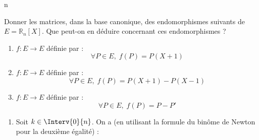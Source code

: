 n\documentclass[a4paper,10pt]{report}
\begin{document}
\begin{Exercice}{} Donner les matrices, dans la base canonique, des endomorphismes suivants de $E=\mathbb{R}_n[X]$. Que peut-on en déduire concernant ces endomorphismes ?

\begin{enumerate}
\item $f : E \rightarrow E$ définie par :
$$ \forall P \in E, \; f(P) = P(X+1) $$
\item $f : E \rightarrow E$ définie par :
$$ \forall P \in E, \; f(P) = P(X+1)-P(X-1) $$
\item $f : E \rightarrow E$ définie par :
$$ \forall P \in E, \; f(P) = P-P' $$
\end{enumerate}
\end{Exercice} 

\begin{enumerate}
\item Soit $k \in \Interv{0}{n}$. On a (en utilisant la formule du binôme de Newton pour la deuxième égalité) : 


\end{enumerate}
\end{document}
